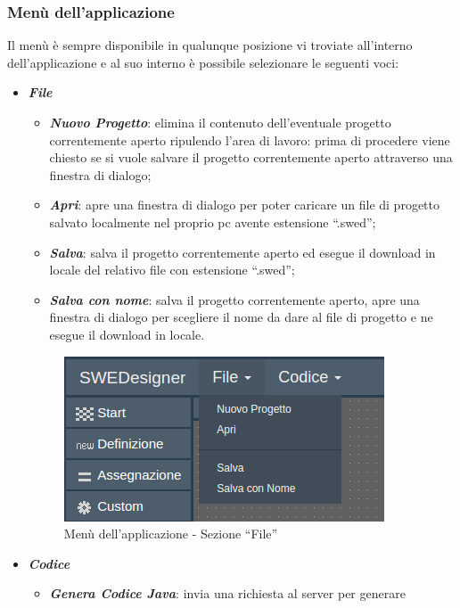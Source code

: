 \documentclass[../ManualeUtente.tex]{subfiles}
\begin{document}
			\subsubsection{Menù dell'applicazione}
				Il menù è sempre disponibile in qualunque posizione vi troviate all'interno
				dell'applicazione e al suo interno è possibile selezionare le seguenti voci:
				\begin{itemize}
					\item \textit{\textbf{File}}
					\begin{itemize}
						\item \textit{\textbf{Nuovo Progetto}}: elimina il contenuto dell'eventuale progetto
						correntemente aperto ripulendo l'area di lavoro: prima di procedere viene chiesto se si vuole
						salvare il progetto correntemente aperto attraverso una finestra di dialogo;
						\item \textit{\textbf{Apri}}: apre una finestra di dialogo per poter caricare un
						file di progetto salvato localmente nel proprio pc avente estensione ``.swed'';
						\item \textit{\textbf{Salva}}: salva il progetto correntemente aperto ed esegue il
						download in locale del relativo file con estensione ``.swed'';
						\item \textit{\textbf{Salva con nome}}: salva il progetto correntemente aperto, apre
						una finestra di dialogo per scegliere il nome da dare al file di progetto e ne esegue
						il download in locale.
					\end{itemize}
					\begin{figure} [h!]
						\centering
						\includegraphics[scale=0.5]{./Immagini/AppFile.png}
						\caption{Menù dell'applicazione - Sezione ``File''}\label{fig:AppFile}
					\end{figure}
					\item \textit{\textbf{Codice}}
					\begin{itemize}
						\item \textit{\textbf{Genera Codice Java}}: invia una richiesta al server per generare

\end{itemize}
\end{itemize}
\end{document}
